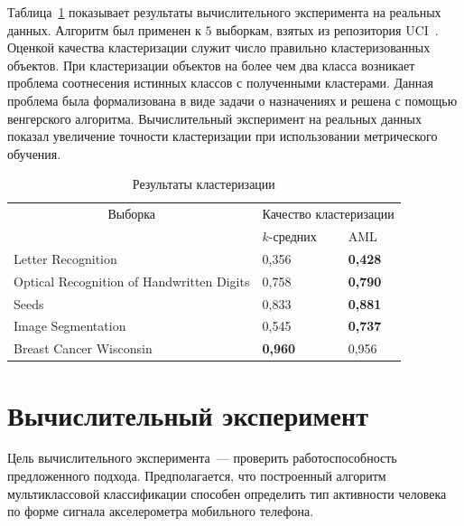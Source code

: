 Таблица~\ref{tbl:clusteing_results} показывает результаты вычислительного эксперимента на реальных
данных.
Алгоритм был применен к $5$ выборкам, взятых из репозитория UCI~\cite{uci2017}.
Оценкой качества кластеризации служит число правильно кластеризованных объектов.
При клас\-те\-ри\-за\-ции объектов на более чем два класса возникает проблема соотнесения истинных классов с полученными кластерами.
Данная проблема была формализована в виде задачи о назначениях и решена с помощью венгерского алгоритма. Вычислительный эксперимент на реальных данных показал увеличение точности кластеризации при использовании метрического обучения.
\begin{table} %
\centering
\caption{Результаты кластеризации}
\label{tbl:clusteing_results}

\vspace{2ex}

\begin{tabular}{|l|l|l|}
\hline
\multicolumn{1}{|c}{Выборка}                  & \multicolumn{2}{c|}{Качество кластеризации} \\ \cline{2-3}
                                          & $k$-средних               & AML                 \\
\hline
Letter Recognition                        & 0,356                 & \textbf{0,428}             \\
Optical Recognition of Handwritten Digits & 0,758                 & \textbf{0,790}               \\
Seeds                                     & 0,833                 & \textbf{0,881}            \\
Image Segmentation                        & 0,545                 & \textbf{0,737}            \\
Breast Cancer Wisconsin                   & \textbf{0,960}                 & 0,956               \\ \hline
\end{tabular}
\end{table}



	\section{Вычислительный эксперимент}
	Цель вычислительного эксперимента~--- проверить работоспособность предложенного подхода.
	Предполагается, что построенный алгоритм мультиклассовой классификации способен определить тип активности человека по форме сигнала акселерометра мобильного телефона.
	
